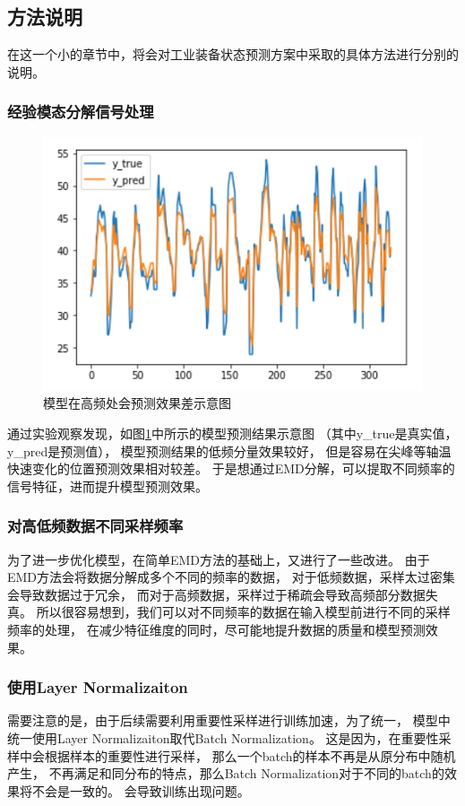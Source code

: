 \subsection{方法说明}
在这一个小的章节中，将会对工业装备状态预测方案中采取的具体方法进行分别的说明。
\subsubsection{经验模态分解信号处理}
  \begin{figure}
    \centering
    \includegraphics[width=0.8\linewidth]{figures/EMD动机.png}
    \caption{模型在高频处会预测效果差示意图}
    \label{fig:EMD motivation}
  \end{figure}
  通过实验观察发现，如图\ref{fig:EMD motivation}中所示的模型预测结果示意图
  （其中y\_true是真实值，y\_pred是预测值），
  模型预测结果的低频分量效果较好，
  但是容易在尖峰等轴温快速变化的位置预测效果相对较差。
  于是想通过EMD分解，可以提取不同频率的信号特征，进而提升模型预测效果。
\subsubsection{对高低频数据不同采样频率}
  为了进一步优化模型，在简单EMD方法的基础上，又进行了一些改进。
  由于EMD方法会将数据分解成多个不同的频率的数据，
  对于低频数据，采样太过密集会导致数据过于冗余，
  而对于高频数据，采样过于稀疏会导致高频部分数据失真。
  所以很容易想到，我们可以对不同频率的数据在输入模型前进行不同的采样频率的处理，
  在减少特征维度的同时，尽可能地提升数据的质量和模型预测效果。

\subsubsection{使用Layer Normalizaiton}
需要注意的是，由于后续需要利用重要性采样进行训练加速，为了统一，
模型中统一使用Layer Normalizaiton取代Batch Normalization。
这是因为，在重要性采样中会根据样本的重要性进行采样，
那么一个batch的样本不再是从原分布中随机产生，
不再满足和同分布的特点，那么Batch Normalization对于不同的batch的效果将不会是一致的。
会导致训练出现问题。

